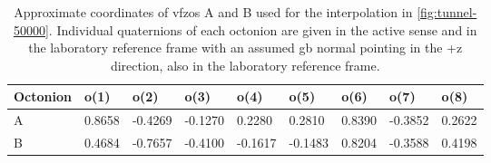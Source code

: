 \documentclass[final,twocolumn,12pt]{elsarticle}
\begin{document}
\begin{table}[]
\centering
\caption{Approximate coordinates of \glspl{vfzo} A and B used for the interpolation in \cref{fig:tunnel-50000}. Individual quaternions of each octonion are given in the active sense and in the laboratory reference frame with an assumed \gls{gb} normal pointing in the +z direction, also in the laboratory reference frame.}
\label{tab:tunnel-AB}
\begin{tabular}{@{}lllllllll@{}}
\toprule
Octonion & o(1)   & o(2)    & o(3)    & o(4)    & o(5)    & o(6)   & o(7)    & o(8)   \\ \midrule
A        & 0.8658 & -0.4269 & -0.1270 & 0.2280  & 0.2810  & 0.8390 & -0.3852 & 0.2622 \\
B        & 0.4684 & -0.7657 & -0.4100 & -0.1617 & -0.1483 & 0.8204 & -0.3588 & 0.4198 \\ \bottomrule
\end{tabular}
\end{table}
\end{document}
